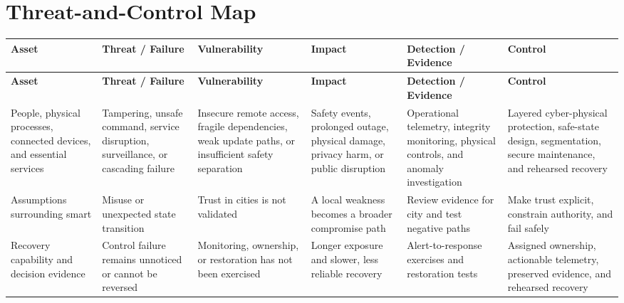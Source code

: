 \documentclass[11pt]{article}
\begin{document}
\section*{Threat-and-Control Map}
\begingroup\scriptsize\setlength{\tabcolsep}{2pt}
\begin{longtable}{>{\RaggedRight\arraybackslash}p{}>{\RaggedRight\arraybackslash}p{}>{\RaggedRight\arraybackslash}p{}>{\RaggedRight\arraybackslash}p{}>{\RaggedRight\arraybackslash}p{}>{\RaggedRight\arraybackslash}p{}}
\toprule\rowcolor{Navy}\color{white}\textbf{Asset} & \color{white}\textbf{Threat / Failure} & \color{white}\textbf{Vulnerability} & \color{white}\textbf{Impact} & \color{white}\textbf{Detection / Evidence} & \color{white}\textbf{Control}\\\midrule
\endfirsthead
\toprule\rowcolor{Navy}\color{white}\textbf{Asset} & \color{white}\textbf{Threat / Failure} & \color{white}\textbf{Vulnerability} & \color{white}\textbf{Impact} & \color{white}\textbf{Detection / Evidence} & \color{white}\textbf{Control}\\\midrule
\endhead
People, physical processes, connected devices, and essential services & Tampering, unsafe command, service disruption, surveillance, or cascading failure & Insecure remote access, fragile dependencies, weak update paths, or insufficient safety separation & Safety events, prolonged outage, physical damage, privacy harm, or public disruption & Operational telemetry, integrity monitoring, physical controls, and anomaly investigation & Layered cyber-physical protection, safe-state design, segmentation, secure maintenance, and rehearsed recovery\\\midrule
Assumptions surrounding smart & Misuse or unexpected state transition & Trust in cities is not validated & A local weakness becomes a broader compromise path & Review evidence for city and test negative paths & Make trust explicit, constrain authority, and fail safely\\\midrule
Recovery capability and decision evidence & Control failure remains unnoticed or cannot be reversed & Monitoring, ownership, or restoration has not been exercised & Longer exposure and slower, less reliable recovery & Alert-to-response exercises and restoration tests & Assigned ownership, actionable telemetry, preserved evidence, and rehearsed recovery\\\midrule
\bottomrule
\end{longtable}
\endgroup
\end{document}
